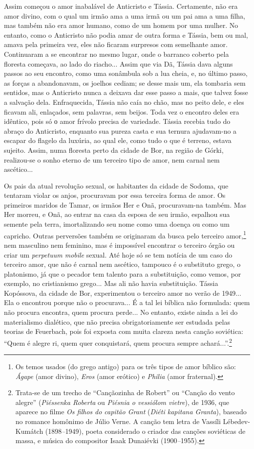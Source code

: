Assim começou o amor inabalável de Anticristo e Tássia. Certamente, não
era amor divino, com o qual um irmão ama a uma irmã ou um pai ama a uma
filha, mas também não era amor humano, como de um homem por uma mulher.
No entanto, como o Anticristo não podia amar de outra forma e Tássia,
bem ou mal, amava pela primeira vez, eles não ficaram surpresos com
semelhante amor. Continuaram a se encontrar no mesmo lugar, onde o
barranco coberto pela floresta começava, ao lado do riacho... Assim que
via Dã, Tássia dava alguns passos ao seu encontro, como uma sonâmbula
sob a lua cheia, e, no último passo, as forças a abandonavam, os joelhos
cediam; se desse mais um, ela tombaria sem sentidos, mas o Anticristo
nunca a deixava dar esse passo a mais, que talvez fosse a salvação dela.
Enfraquecida, Tássia não caía no chão, mas no peito dele, e eles ficavam
ali, enlaçados, sem palavras, sem beijos. Toda vez o encontro deles era
idêntico, pois só о amor frívolo precisa de variedade. Tássia recebia
tudo do abraço do Anticristo, enquanto sua pureza casta e sua ternura
ajudavam-no a escapar do flagelo da luxúria, ao qual ele, como tudo o
que é terreno, estava sujeito. Assim, numa floresta perto da cidade de
Bor, na região de Górki, realizou-se o sonho eterno de um terceiro tipo
de amor, nem carnal nem ascético...

Os pais da atual revolução sexual, os habitantes da cidade de Sodoma,
que tentaram violar os anjos, procuravam por essa terceira forma de
amor. Os primeiros maridos de Tamar, os irmãos Her e Onã, procuravam-na
também. Mas Her morreu, e Onã, ao entrar na casa da esposa de seu irmão,
espalhou sua semente pela terra, imortalizando seu nome como uma doença
ou como um capricho. Outras perversões também se originaram da busca
pelo terceiro amor,\footnote{Os temos usados (do grego antigo) para os
  três tipos de amor bíblico são: \emph{Ágape} (amor divino),
  \emph{Eros} (amor erótico) e \emph{Philia} (amor fraternal).} nem
masculino nem feminino, mas é impossível encontrar o terceiro órgão ou
criar um \emph{perpetuum mobile} sexual. Até hoje só se tem notícia de
um caso do terceiro amor, que não é carnal nem ascético, tampouco é o
substituto grego, o platonismo, já que o pecador tem talento para a
substituição, como vemos, por exemplo, no cristianismo grego... Mas ali
não havia substituição. Tássia Kopóssova, da cidade de Bor, experimentou
o terceiro amor no verão de 1949... Ela o encontrou porque não o
procurava... É a tal lei bíblica não formulada: quem não procura
encontra, quem procura perde... No entanto, existe ainda a lei do
materialismo dialético, que não precisa obrigatoriamente ser estudada
pelas teorias de Feuerbach, pois foi exposta com muita clareza nesta
canção soviética: ``Quem é alegre ri, quem quer conquistará, quem
procura sempre achará...''.\footnote{Trata-se de um trecho de
  ``Cançãozinha de Robert'' ou ``Canção do vento alegre''
  (\emph{Piéssenka Roberta} ou \emph{Piésnia o vessiólom vietre}), de
  1936, que aparece no filme \emph{Os filhos do capitão Grant}
  (\emph{Diéti kapitana Granta}), baseado no romance homônimo de Júlio
  Verne. A canção tem letra de Vassíli Lébedev-Kumátch
  (1898\emph{--}1949), poeta considerado o criador das canções
  soviéticas de massa, e música do compositor Isaak Dunaiévki
  (1900\emph{--}1955).}

